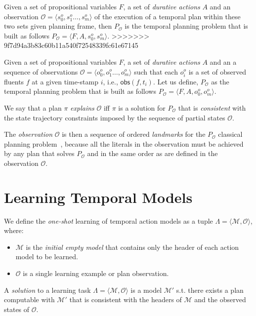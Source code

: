 \documentclass[runningheads]{llncs}
\newcommand{\tup}[1]{{\langle #1 \rangle}}
\newcommand{\obs}{\mathsf{obs}}    %
\begin{document}
Given a set of propositional variables $F$, a set of {\em durative actions} $A$ and an observation $\mathcal{O}=\tup{s_0^o,s_1^o \ldots , s_m^o}$ of the execution of a temporal plan within these two sets given planning frame, then $P_\mathcal{O}$ is the temporal planning problem that is built as follows $P_\mathcal{O}=\tup{F,A,s_0^o,s_m^o}$.
>>>>>>> 9f7d94a3b83c60b11a540f72548339fc61e67145

Given a set of propositional variables $F$, a set of {\em durative actions} $A$ and an a sequence of observations $\mathcal{O}=\tup{o_0^o,o_1^o \ldots , o_m^o}$ such that each $o_i^o$ is a set of observed fluents $f$ at a given time-stamp $i$, i.e., $\obs(f,t_i)$. Let us define, $P_\mathcal{O}$ as the temporal planning problem that is built as follows $P_\mathcal{O}=\tup{F,A,o_0^o,o_m^o}$. 
\begin{definition}[Explanation]
We say that a plan $\pi$ {\em explains} $\mathcal{O}$ iff $\pi$ is a solution for $P_\mathcal{O}$ that is {\em consistent} with the state trajectory constraints imposed by the sequence of partial states $\mathcal{O}$.
\end{definition}

The {\em observation} $\mathcal{O}$ is then a sequence of ordered {\em landmarks} for the $P_\mathcal{O}$ classical planning problem~\cite{hoffmann2004ordered}, because all the literals in the observation must be achieved by any plan that solves $P_\mathcal{O}$ and in the same order as are defined in the observation $\mathcal{O}$.



\section{Learning Temporal Models}
\label{sec:learning}

We define the {\em one-shot} learning of temporal action models as a tuple $\Lambda=\tup{\mathcal{M},{\mathcal O}}$, where:

\begin{itemize}
\item $\mathcal{M}$ is the {\em initial empty model} that contains only the header of each action model to be learned.
\item $\mathcal{O}$ is a single learning example or plan observation.
\end{itemize}

A {\em solution} to a learning task $\Lambda=\tup{\mathcal{M},{\mathcal O}}$ is a model $\mathcal{M}'$ s.t. there exists a plan computable with $\mathcal{M}'$ that is consistent with the headers of $\mathcal{M}$ and the observed states of $\mathcal{O}$. 
\end{document}
